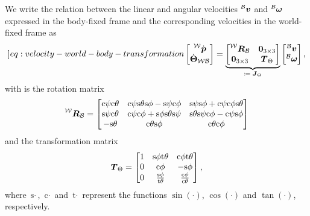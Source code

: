 We write the relation between the linear and angular velocities $\prescript{\mathcal{B}}{}{\mbox{$\bm{v}$}}$ and $\prescript{\mathcal{B}}{}{\mbox{$\bm{\omega}$}}$ expressed in the body-fixed frame and the corresponding velocities in the world-fixed frame as
\begin{equation}
	\label[]{eq:velocity-world-body-transformation}
	\begin{bmatrix}
		\vlinworld \\
		\vangworld
	\end{bmatrix}
	=
	\underbrace{
	\begin{bmatrix}
		\Rbodyworld & \bm{0}_{3 \times 3} \\
		\bm{0}_{3 \times 3} & \TbodyWorld
	\end{bmatrix}
	}_{\mbox{\scriptsize $\coloneqq \Jb_\Theta$}}
	\begin{bmatrix}
		\vlinbody \\
		\vangbody
	\end{bmatrix},
\end{equation}
with is the rotation matrix 
\begin{equation}
	\label{eq:rotation-matrix}
	\Rbodyworld = 
	\begin{bmatrix}
		\text{c}\psi\text{c}\theta
		& \text{c}\psi \text{s}\theta \text{s}\phi - \text{s}\psi \text{c}\phi
		& \text{s}\psi \text{s}\phi + \text{c}\psi \text{c}\phi \text{s} \theta \\
		\text{s}\psi \text{c}\theta
		& \text{c}\psi \text{c}\phi + \text{s}\phi \text{s}\theta \text{s}\psi
		& \text{s}\theta \text{s}\psi \text{c}\phi - \text{c}\psi \text{s}\phi \\
		-\text{s}\theta
		& \text{c}\theta \text{s}\phi
		& \text{c}\theta \text{c}\phi
	\end{bmatrix}
\end{equation}
and the transformation matrix
\begin{equation}
	\label{eq:transformation}
	\mbox{$\bm{T}$}_\Theta = 
	\begin{bmatrix}
		1 & \text{s}\phi \text{t}\theta & \text{c}\phi \text{t}\theta \\
		0 & \text{c}\phi & -\text{s}\phi \\
		0 & \frac{\text{s}\phi}{\text{t}\theta} & \frac{\text{c}\phi}{\text{c}\theta}
	\end{bmatrix},
\end{equation}
where $\text{s}\cdot$, $\text{c}\cdot$ and $\text{t}\cdot$ represent the functions $\sin(\cdot)$, $\cos(\cdot)$ and $\tan(\cdot)$, respectively.


